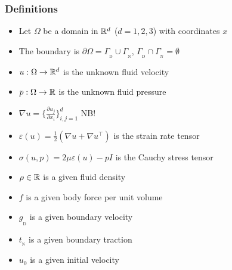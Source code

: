   \begin{frame}

  \frametitle{Definitions}

    \begin{itemize}
    \item
      Let $\Omega$ be a domain in $\mathbb{R}^d$ ($d = 1, 2, 3$) with coordinates $x$
    \item
      The boundary is $\partial \Omega = \Gamma_{_\mathrm D} \cup
      \Gamma_{_\mathrm N}$, $\Gamma_{_\mathrm D} \cap \Gamma_{_\mathrm
        N} = \emptyset$
    \item
      $u : \Omega \rightarrow \mathbb{R}^d$ is the \alert{unknown} fluid velocity
    \item
      $p : \Omega \rightarrow \mathbb{R}$ is the \alert{unknown} fluid pressure
    \item
      $\nabla u = \{ \frac{\partial u_j}{\partial x_i}\}_{i, j=1}^{d}$ \alert{NB!}
    \item
      $\varepsilon(u) = \frac{1}{2}(\nabla u + \nabla u^{\top})$ is
      the strain rate tensor
    \item
      $\sigma(u, p) = 2\mu\varepsilon(u) - pI$ is the Cauchy stress tensor
    \item
      $\rho \in \mathbb{R}$ is a given fluid density
    \item
      $f$ is a given body force per unit volume
    \item
      $g_{_\mathrm{D}}$ is a given boundary velocity
    \item
      $t_{_\mathrm{N}}$ is a given boundary traction
    \item
      $u_0$ is a given initial velocity
    \end{itemize}
\end{frame}
